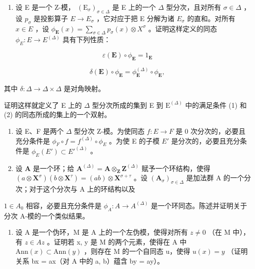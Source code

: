 \begin{enumerate}
\def\labelenumi{(\alph{enumi})}
\tightlist
\item
  设 E 是一个 Z-模， \((\mathrm{E}_{\sigma})_{\sigma\in\Delta}\) 是 E 上的一个 \(\Delta\) 型分次，且对所有 \(\sigma\in\Delta\) ，设 \(p_{\sigma}\) 是投影算子 \(E\to E_{\sigma}\) ，它对应于把 E 分解为诸 \(E_{\sigma}\) 的直和。对所有 \(x\in E\) ，设 \(\phi_{\mathbf{E}}(x)=\sum_{\sigma\in\Delta}p_{\sigma}(x)\otimes X^{\sigma}\) 。证明这样定义的同态 \(\phi_{E}\colon E\to E^{(\Delta)}\) 具有下列性质：
\end{enumerate}

\[
\varepsilon (\mathbf {E}) \circ \phi_ {\mathbf {E}} = 1 _ {\mathbf {E}}\tag{1}
\]

\[
\delta (\mathbf {E}) \circ \phi_ {\mathbf {E}} = \phi_ {\mathbf {E}} ^ {(\Delta)} \circ \phi_ {\mathbf {E}},\tag{2}
\]

其中 \(\delta: \Delta \to \Delta \times \Delta\) 是对角映射。

证明这样就定义了 E 上的 \(\Delta\) 型分次所成的集到 E 到 \(\mathrm{E}^{(\Delta)}\) 中的满足条件 (1) 和 (2) 的同态所成的集上的一个双射。

\begin{enumerate}
\def\labelenumi{(\alph{enumi})}
\setcounter{enumi}{1}
\item
  设 E、F 是两个 \(\Delta\) 型分次 Z-模。为使同态 \(f: E \to F\) 是 0 次分次的，必要且充分条件是 \(\phi_{F} \circ f = f^{(\Delta)} \circ \phi_{E}\) 。为使 E 的子模 \(E'\) 是分次的，必要且充分条件是 \(\phi_{E}(E') \subset E'^{(\Delta)}\) 。
\item
  设 \(\mathbf{A}\) 是一个环；给 \(\mathbf{A}^{(\Delta)} = \mathbf{A} \otimes_{\mathbf{Z}} \mathbf{Z}^{(\Delta)}\) 赋予一个环结构，使得 \((a \otimes \mathbf{X}^{\sigma})(b \otimes \mathbf{X}^{\tau}) = (ab) \otimes \mathbf{X}^{\sigma + \tau}\) 。设 \((\mathbf{A}_{\sigma})_{\sigma \in \Delta}\) 是加法群 A 的一个分次；对于这个分次与 A 上的环结构以及
\end{enumerate}

\(1 \in A_{0}\) 相容，必要且充分条件是 \(\phi_{A}: A \to A^{(\Delta)}\) 是一个环同态。陈述并证明关于分次 A-模的一个类似结果。

\BourbakiAppendixExercises

\begin{enumerate}
\def\labelenumi{\arabic{enumi}.}
\tightlist
\item
  设 A 是一个伪环，M 是 A 上的一个左伪模，使得对所有 \(z \neq 0\) （在 M 中），有 \(z \in Az\) 。证明若 x, y 是 M 的两个元素，使得在 A 中 \(\text{Ann}(x) \subset \text{Ann}(y)\) ，则存在 M 的一个自同态 u，使得 \(u(x) = y\) （证明关系 bx = ax（对 A 中的 a, b）蕴含 by = ay）。
\end{enumerate}


